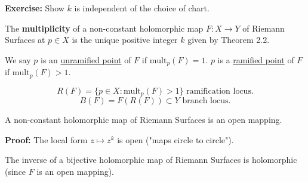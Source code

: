 \documentclass{article}
\begin{document}
\textbf{Exercise:}
Show $k$ is independent of the choice of chart.

\begin{definition}
    The \textbf{multiplicity} of a non-constant holomorphic map $F: X \to Y$
    of Riemann Surfaces at $p \in X$ is the unique positive integer $k$ given by
    Theorem 2.2.
\end{definition}

We say $p$ is an \underline{unramified point} of $F$ if $\mathrm{mult}_p(F) = 1$.
$p$ is a \underline{ramified point} of $F$ if $\mathrm{mult}_p(F) > 1$.

$$
R(F) = \{ p \in X : \mathrm{mult}_p(F) > 1 \} \text{ ramification locus.}
$$
$$
B(F) = F(R(F)) \subset Y \text{ branch locus.}
$$

\begin{theorem} \label{thm:openmapping}
    A non-constant holomorphic map of Riemann Surfaces is an open mapping.
\end{theorem}

\textbf{Proof:} The local form $z \mapsto z^k$ is open
("maps circle to circle").

\begin{theorem} \label{thm:biholo}
    The inverse of a bijective holomorphic map of Riemann Surfaces is holomorphic
    (since $F$ is an open mapping).
\end{theorem}
\end{document}
